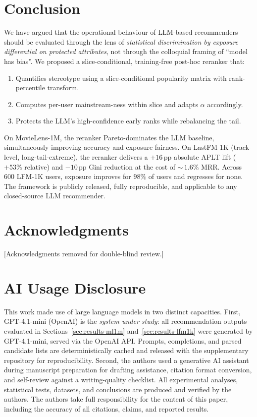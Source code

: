 \section{Conclusion}
\label{sec:conclusion}

We have argued that the operational behaviour of LLM-based recommenders should be evaluated through the lens of \emph{statistical discrimination by exposure differential on protected attributes}, not through the colloquial framing of ``model has bias''. We proposed a slice-conditional, training-free post-hoc reranker that:
\begin{enumerate}
\item Quantifies stereotype using a slice-conditional popularity matrix with rank-percentile transform.
\item Computes per-user mainstream-ness within slice and adapts $\alpha$ accordingly.
\item Protects the LLM's high-confidence early ranks while rebalancing the tail.
\end{enumerate}

On MovieLens-1M, the reranker Pareto-dominates the LLM baseline, simultaneously improving accuracy and exposure fairness. On LastFM-1K (track-level, long-tail-extreme), the reranker delivers a $+16$\,pp absolute APLT lift (${+}53\%$ relative) and $-10$\,pp Gini reduction at the cost of ${\sim}\,1.6\%$ MRR. Across 600 LFM-1K users, exposure improves for $98\%$ of users and regresses for none. The framework is publicly released, fully reproducible, and applicable to any closed-source LLM recommender.

\section*{Acknowledgments}

[Acknowledgments removed for double-blind review.]

\section*{AI Usage Disclosure}

This work made use of large language models in two distinct capacities. First, GPT-4.1-mini (OpenAI) is the \emph{system under study}: all recommendation outputs evaluated in Sections~\ref{sec:results-ml1m} and~\ref{sec:results-lfm1k} were generated by GPT-4.1-mini, served via the OpenAI API. Prompts, completions, and parsed candidate lists are deterministically cached and released with the supplementary repository for reproducibility. Second, the authors used a generative AI assistant during manuscript preparation for drafting assistance, citation format conversion, and self-review against a writing-quality checklist. All experimental analyses, statistical tests, datasets, and conclusions are produced and verified by the authors. The authors take full responsibility for the content of this paper, including the accuracy of all citations, claims, and reported results.
